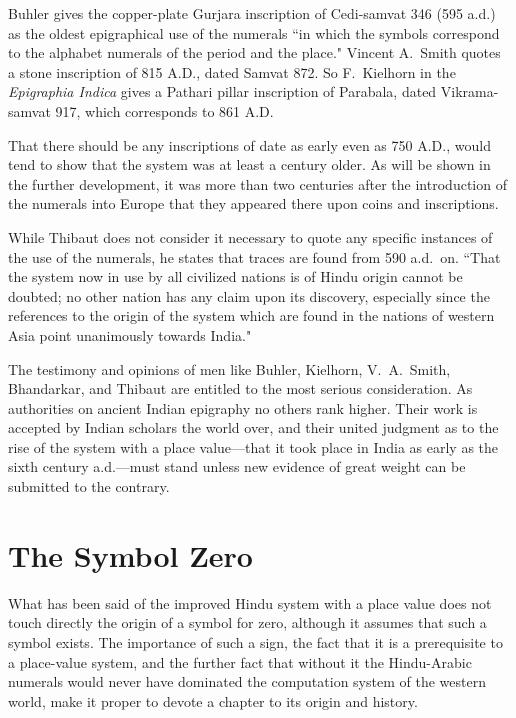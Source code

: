\documentclass[11pt,a4paper]{article}
\begin{document}
Buhler gives the copper-plate Gurjara inscription of Cedi-samvat 346 (595 a.d.) as the oldest epigraphical use of the numerals ``in which the symbols correspond to the alphabet numerals of the period and the place." Vincent A.\ Smith quotes a stone inscription of 815 A.D., dated Samvat 872. So F.\ Kielhorn in the \textit{Epigraphia Indica} gives a Pathari pillar inscription of Parabala, dated Vikrama-samvat 917, which corresponds to 861 A.D.

That there should be any inscriptions of date as early even as 750 A.D., would tend to show that the system was at least a century older. As will be shown in the further development, it was more than two centuries after the introduction of the numerals into Europe that they appeared there upon coins and inscriptions.

While Thibaut does not consider it necessary to quote any specific instances of the use of the numerals, he states that traces are found from 590 a.d.\ on. ``That the system now in use by all civilized nations is of Hindu origin cannot be doubted; no other nation has any claim upon its discovery, especially since the references to the origin of the system which are found in the nations of western Asia point unanimously towards India."

The testimony and opinions of men like Buhler, Kielhorn, V.\ A.\ Smith, Bhandarkar, and Thibaut are entitled to the most serious consideration. As authorities on ancient Indian epigraphy no others rank higher. Their work is accepted by Indian scholars the world over, and their united judgment as to the rise of the system with a place value---that it took place in India as early as the sixth century a.d.---must stand unless new evidence of great weight can be submitted to the contrary.

\newpage


\section{The Symbol Zero}

What has been said of the improved Hindu system with a place value does not touch directly the origin of a symbol for zero, although it assumes that such a symbol exists. The importance of such a sign, the fact that it is a prerequisite to a place-value system, and the further fact that without it the Hindu-Arabic numerals would never have dominated the computation system of the western world, make it proper to devote a chapter to its origin and history.
\end{document}
